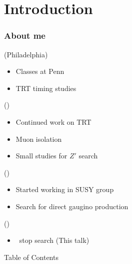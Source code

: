 \documentclass[10pt, svgnames]{beamer}
\begin{document}
\section{Introduction}

\begin{frame}
  \frametitle{About me}
  \begin{description}[0ex]
    \item[2008-2010] (Philadelphia) \\
      \begin{itemize}
        \item Classes at Penn
        \item TRT timing studies
      \end{itemize}
    \item[2010-2012] (\cern) \\
      \begin{itemize}
        \item Continued work on TRT
        \item Muon isolation
        \item Small studies for $Z'$ search
      \end{itemize}
    \item[2012-2013] (\cern) \\
      \begin{itemize}
        \item Started working in SUSY group
        \item Search for direct gaugino production
      \end{itemize}
    \item[2013-2015] (\cern) \\
      \begin{itemize}
        \item \BMINUSL\ stop search (This talk)
      \end{itemize}
  \end{description}
\end{frame}

\begin{frame}{Table of Contents}
  \tableofcontents
\end{frame}

\end{document}
